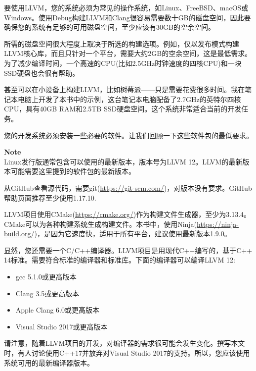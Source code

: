 要使用LLVM，您的系统必须为常见的操作系统，如Linux、FreeBSD、macOS或Windows。使用Debug构建LLVM和Clang很容易需要数十GB的磁盘空间，因此要确保您的系统有足够的可用磁盘空间，至少应该有30GB的空余空间。\par

所需的磁盘空间很大程度上取决于所选的构建选项。例如，仅以发布模式构建LLVM核心库，而且只针对一个平台，需要大约2GB的空余空间，这是最低需求。为了减少编译时间，一个高速的CPU(比如2.5GHz时钟速度的四核CPU)和一块SSD硬盘也会很有帮助。\par

甚至可以在小设备上构建LLVM，比如树莓派——只是需要花费很多时间。我在笔记本电脑上开发了本书中的示例，这台笔记本电脑配备了2.7GHz的英特尔四核CPU，具有40GB RAM和2.5TB SSD硬盘空间。这个系统非常适合当前的开发任务。\par

您的开发系统必须安装一些必要的软件。让我们回顾一下这些软件包的最低要求。\par

\begin{tcolorbox}[colback=blue!5!white,colframe=blue!75!black]
\textbf{Note} \\
Linux发行版通常包含可以使用的最新版本，版本号为LLVM 12。LLVM的最新版本可能需要这里提到的软件包的最新版本。
\end{tcolorbox}

从GitHub查看源代码，需要git(\url{https://git-scm.com/})，对版本没有要求。GitHub帮助页面推荐至少使用1.17.10.\par

LLVM项目使用CMake(\url{https://cmake.org/})作为构建文件生成器，至少为3.13.4。CMake可以为各种构建系统生成构建文件。本书中，使用Ninja(\url{https://ninja-build.org/})，是因为它速度快，适用于所有平台，建议使用最新版本1.9.0。\par

显然，您还需要一个C/C++编译器。LLVM项目是用现代C++编写的，基于C++ 14标准。需要符合标准的编译器和标准库。下面的编译器可以编译LLVM 12:\par

\begin{itemize}
	\item gcc 5.1.0或更高版本
	\item Clang 3.5或更高版本
	\item Apple Clang 6.0或更高版本
	\item Visual Studio 2017或更高版本
\end{itemize}

请注意，随着LLVM项目的开发，对编译器的需求很可能会发生变化。撰写本文时，有人讨论使用C++17并放弃对Visual Studio 2017的支持。所以，您应该使用系统可用的最新编译器版本。\par

